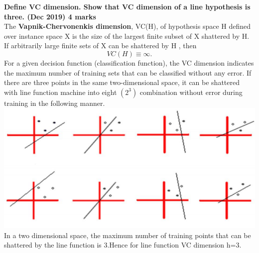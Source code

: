 
\textbf{\textcolor{LightMagenta}{Define VC dimension. Show that VC dimension of a line hypothesis is three. (Dec 2019) \hfill 4 marks}} \\[5pt]
The \textbf{Vapnik-Chervonenkis dimension}, VC(H), of hypothesis space H defined over instance space X is the size of the largest finite subset of X shattered by H. If arbitrarily large finite sets of X can be shattered by H , then \[VC(H)\equiv\infty.\]
For a given decision function (classification function), the VC dimension indicates the maximum number of training sets that can be classified without any error. If there are three points in the same two-dimensional space, it can be shattered with line function machine into eight $(2^3)$ combination without error during training in the following manner.\\
\includegraphics[scale=0.5]{Images/A35_img1.png}\\
In a two dimensional space, the maximum number of training points that can be shattered by the line function is 3.Hence for line function VC dimension h=3.